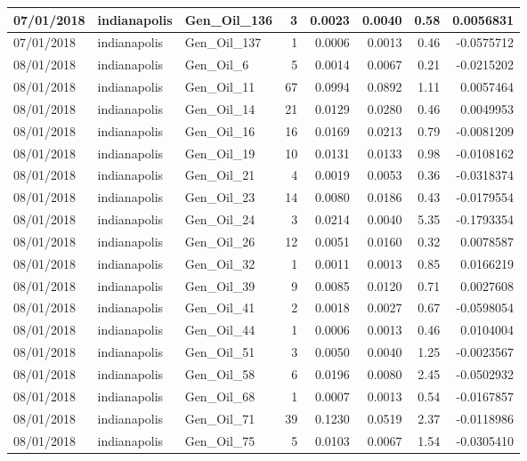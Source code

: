 \documentclass[
  letterpaper,
  DIV=11,
  numbers=noendperiod]{scrartcl}
\begin{document}
\begin{tabular}{l|l|l|r|r|r|r|r}
\hline
07/01/2018 & indianapolis & Gen\_Oil\_136 & 3 & 0.0023 & 0.0040 & 0.58 & 0.0056831\\
\hline
07/01/2018 & indianapolis & Gen\_Oil\_137 & 1 & 0.0006 & 0.0013 & 0.46 & -0.0575712\\
\hline
08/01/2018 & indianapolis & Gen\_Oil\_6 & 5 & 0.0014 & 0.0067 & 0.21 & -0.0215202\\
\hline
08/01/2018 & indianapolis & Gen\_Oil\_11 & 67 & 0.0994 & 0.0892 & 1.11 & 0.0057464\\
\hline
08/01/2018 & indianapolis & Gen\_Oil\_14 & 21 & 0.0129 & 0.0280 & 0.46 & 0.0049953\\
\hline
08/01/2018 & indianapolis & Gen\_Oil\_16 & 16 & 0.0169 & 0.0213 & 0.79 & -0.0081209\\
\hline
08/01/2018 & indianapolis & Gen\_Oil\_19 & 10 & 0.0131 & 0.0133 & 0.98 & -0.0108162\\
\hline
08/01/2018 & indianapolis & Gen\_Oil\_21 & 4 & 0.0019 & 0.0053 & 0.36 & -0.0318374\\
\hline
08/01/2018 & indianapolis & Gen\_Oil\_23 & 14 & 0.0080 & 0.0186 & 0.43 & -0.0179554\\
\hline
08/01/2018 & indianapolis & Gen\_Oil\_24 & 3 & 0.0214 & 0.0040 & 5.35 & -0.1793354\\
\hline
08/01/2018 & indianapolis & Gen\_Oil\_26 & 12 & 0.0051 & 0.0160 & 0.32 & 0.0078587\\
\hline
08/01/2018 & indianapolis & Gen\_Oil\_32 & 1 & 0.0011 & 0.0013 & 0.85 & 0.0166219\\
\hline
08/01/2018 & indianapolis & Gen\_Oil\_39 & 9 & 0.0085 & 0.0120 & 0.71 & 0.0027608\\
\hline
08/01/2018 & indianapolis & Gen\_Oil\_41 & 2 & 0.0018 & 0.0027 & 0.67 & -0.0598054\\
\hline
08/01/2018 & indianapolis & Gen\_Oil\_44 & 1 & 0.0006 & 0.0013 & 0.46 & 0.0104004\\
\hline
08/01/2018 & indianapolis & Gen\_Oil\_51 & 3 & 0.0050 & 0.0040 & 1.25 & -0.0023567\\
\hline
08/01/2018 & indianapolis & Gen\_Oil\_58 & 6 & 0.0196 & 0.0080 & 2.45 & -0.0502932\\
\hline
08/01/2018 & indianapolis & Gen\_Oil\_68 & 1 & 0.0007 & 0.0013 & 0.54 & -0.0167857\\
\hline
08/01/2018 & indianapolis & Gen\_Oil\_71 & 39 & 0.1230 & 0.0519 & 2.37 & -0.0118986\\
\hline
08/01/2018 & indianapolis & Gen\_Oil\_75 & 5 & 0.0103 & 0.0067 & 1.54 & -0.0305410\\

\end{tabular}
\end{document}
